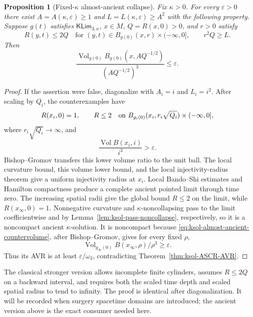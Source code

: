 \documentclass[10pt]{coll-l}
\newtheorem{proposition}[theorem]{Proposition}
\theoremstyle{definition}
\theoremstyle{remark}
\numberwithin{section}{chapter}
\numberwithin{equation}{chapter}
\newcommand{\Vol}{\operatorname{Vol}}
\begin{document}
\begin{proposition}[Fixed-$\kappa$ almost-ancient collapse]
\label{prop:ksol-almost-ancient-collapse}
Fix $\kappa>0$.  For every $\varepsilon>0$ there exist
$A=A(\kappa,\varepsilon)\geq1$ and
$L=L(\kappa,\varepsilon)\geq A^2$ with the following property.
Suppose $g(t)$ satisfies $\mathsf{KLim}_{3,\kappa}$, $x\in M$,
$Q=R(x,0)>0$, and $r>0$ satisfy
\begin{equation}
 R(y,t)\leq2Q
 \quad\text{for }(y,t)\in B_{g(0)}(x,r)\times(-\infty,0],
 \qquad r^2Q\geq L.                                  \label{eq:ksol-almost-ancient-hyp}
\end{equation}
Then
\begin{equation}
 \frac{\Vol_{g(0)}B_{g(0)}(x,AQ^{-1/2})}
      {(AQ^{-1/2})^3}\leq\varepsilon.                 \label{eq:ksol-almost-ancient-conclusion}
\end{equation}
\end{proposition}

\begin{proof}
If the assertion were false, diagonalize with $A_i=i$ and $L_i=i^2$.
After scaling by $Q_i$, the counterexamples have
\[
 R(x_i,0)=1,\qquad R\leq2
 \quad\hbox{on }B_{g_i(0)}(x_i,r_i\sqrt{Q_i})
                    \times(-\infty,0],
\]
where $r_i\sqrt{Q_i}\to\infty$, and
\begin{equation}
                 \frac{\Vol B(x_i,i)}{i^3}>\varepsilon.        \label{eq:ksol-almost-ancient-countervolume}
\end{equation}
Bishop--Gromov transfers this lower volume ratio to the unit ball.
The local curvature bound, this volume lower bound, and the local
injectivity-radius theorem give a uniform injectivity radius at $x_i$.
Local Bando--Shi estimates and Hamilton compactness produce a complete
ancient pointed limit through time zero.  The increasing spatial radii give
the global bound $R\leq2$ on the limit, while
$R(x_\infty,0)=1$.  Nonnegative curvature and $\kappa$-noncollapsing pass
to the limit coefficientwise and by
Lemma~\ref{lem:ksol-pass-noncollapse}, respectively, so it is a noncompact
ancient $\kappa$-solution.  It is
noncompact because \eqref{eq:ksol-almost-ancient-countervolume}, after
Bishop--Gromov, gives for every fixed $\rho$,
\[
       \Vol_{g_\infty(0)}B(x_\infty,\rho)/\rho^3
                   \geq\varepsilon.
\]
Thus its AVR is at least $\varepsilon/\omega_3$, contradicting
Theorem~\ref{thm:ksol-ASCR-AVR}.
\end{proof}

The classical stronger version allows incomplete finite cylinders, assumes
$R\leq2Q$ on a backward interval, and requires both the scaled time depth
and scaled spatial radius to tend to infinity.  The proof is identical after
diagonalization.  It will be recorded when surgery spacetime domains are
introduced; the ancient version above is the exact consumer needed here.
\end{document}
